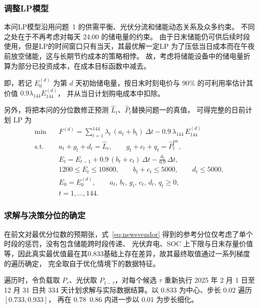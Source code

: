 \documentclass[zihao=-4,a4paper,fontset=none]{ctexart}
\begin{document}
\subsubsection{调整LP模型}
\label{sub:p2build}

本问LP模型沿用问题~1 的供需平衡、光伏分流和储能动态关系及众多约束。
不同之处在于不再考虑对每天 24:00 的储电量的约束。
由于日末储能仍可供后续时段使用，但是LP的时间窗口只有当天，其最优解一定LP 为了压低当日成本而在午夜前放空储能，这与长期节约成本的策略相悖。
故，考虑将储能设备中的储电量折算为部分已投资成本，在成本目标函数中减去。

即，若记 $E_0^{(d)}$ 为第 $d$ 天初始储电量，按日末时刻电价与 90\% 的可利用率估计其价值 $0.9\lambda_{144}E_{144}^{(d)}$，
并从当日计划购电成本中扣除。

另外，将把本问的分位数修正预测 $\hat L_t$、$\hat P_t$替换问题一的真值，
可得完整的日前计划 LP 为
\begin{equation}
\begin{aligned}
\min\quad & F^{(d)}=\sum_{t=1}^{144}\lambda_t\,(a_t+b_t)\,\Delta t-0.9\,\lambda_{144}\,E_{144}^{(d)} \\
\text{s.t.}\quad
& a_t+g_t+d_t=\hat L_t,\qquad g_t+c_t+q_t=\hat P_t^{\mathrm{pv}}, \\
& E_t=E_{t-1}+0.9\,(b_t+c_t)\,\Delta t-\frac{d_t}{0.9}\,\Delta t,\\
& 1200\le E_t\le 10800,\qquad b_t+c_t\le 5000,\qquad d_t\le 5000,\\
& E_0=E_0^{(d)},\qquad a_t,\,b_t,\,g_t,\,c_t,\,d_t,\,q_t\ge 0,\\
& t=1,\dots,144 .
\end{aligned}
\label{eq:p2obj}
\end{equation}

\subsubsection{求解与决策分位的确定}
\label{sub:p2tau}

在前文对最优分位数的预期张，式~\eqref{eq:newsvendor} 得到的参考分位仅考虑了单个时段的惩罚，没有包含储能跨时段传递、
光伏弃电、SOC 上下限与日末存量价值等，因此真实最优值最在其0.833基础上存在差异，故其最终取值通过一系列梯度的遍历确定，
完全取自于优化情境下的数据特征。

遍历时，令负载取 $P_{\tau}$、光伏取 $P_{1-\tau}$，对每个候选 $\tau$ 重新执行 2025
 年 2 月 1 日至 12 月 31 日共 334 天计划求解与实际数据结算。以 0.833 为中心、步长 0.02 遍历 $[0.733,0.933]$，
 再在 $0.78$~$0.86$ 内进一步以 0.01 为步长细化。
 
\end{document}
